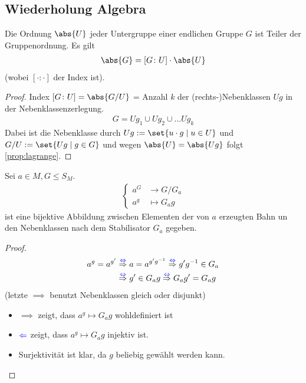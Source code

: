 \subsection*{Wiederholung Algebra}
\begin{proposition}\label{prop:lagrange}
	Die Ordnung $\abs{U}$ jeder Untergruppe einer endlichen Gruppe $G$ ist Teiler der Gruppenordnung. Es gilt
	\begin{align*}
		\abs{G} = [G\colon U]\cdot \abs{U}
	\end{align*}
	(wobei $[\cdot\colon \cdot]$ der Index ist).
\end{proposition}
\begin{proof}
	Index $[G\colon U] = \abs{G/U}$ = Anzahl $k$ der (rechts-)Nebenklassen $Ug$ in der Nebenklassenzerlegung.
	\begin{align*}
		G = U g_1 \cup U g_2 \cup \dots U g_k
	\end{align*}
	Dabei ist die Nebenklasse durch $Ug := \set{u\cdot g \mid u \in U}$ und $G/U := \set{Ug \mid g \in G}$ und wegen $\abs{U} = \abs{Ug}$ folgt \cref{prop:lagrange}.
\end{proof}
\begin{lemma}\label{lem:stab}
	Sei $a \in M, G \le S_M$.
	\begin{align*}
		\begin{cases}
			a^G &\to G/G_a\\
			a^g &\mapsto G_a g
		\end{cases}
	\end{align*}
	ist eine bijektive Abbildung zwischen Elementen der von $a$ erzeugten Bahn un den Nebenklassen nach dem Stabilisator $G_a$ gegeben.
\end{lemma}
\begin{proof}
	\begin{align*}
		a^g = a^{g'} &\overset{\textcolor{blue}{\Leftrightarrow}}{\Rightarrow} a= a^{g'g^{-1}}\overset{\textcolor{blue}{\Leftrightarrow}}{\Rightarrow} g'g^{-1} \in G_a\\
		&\overset{\textcolor{blue}{\Leftrightarrow}}{\Rightarrow} g' \in G_a g\overset{\textcolor{blue}{\Leftrightarrow}}{\Rightarrow} G_a g' = G_a g
	\end{align*}
	(letzte $\implies$ benutzt Nebenklassen gleich oder disjunkt)
	\begin{itemize}
		\item $\implies$ zeigt, dass $a^g \mapsto G_a g$ wohldefiniert ist
		\item $\textcolor{blue}{\Leftarrow}$ zeigt, dass $a^g \mapsto G_a g$ injektiv ist.
		\item Surjektivität ist klar, da $g$ beliebig gewählt werden kann.
	\end{itemize}
\end{proof}
